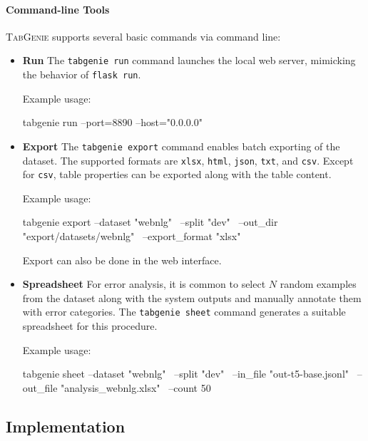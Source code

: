 \paragraph{Command-line Tools} \textsc{TabGenie} supports several basic commands via command line:
\begin{itemize}
    \item \textbf{Run} The \texttt{tabgenie run} command launches the local web server, mimicking the behavior of \texttt{flask run}.

          \noindent Example usage:
\begin{bash}
tabgenie run --port=8890 --host="0.0.0.0"
\end{bash}
    \item \textbf{Export} The \texttt{tabgenie export} command enables batch exporting of the dataset. The supported formats are \texttt{xlsx}, \texttt{html}, \texttt{json}, \texttt{txt}, and \texttt{csv}. Except for \texttt{csv}, table properties can be exported along with the table content.

          \noindent Example usage:
\begin{bash}
tabgenie export --dataset "webnlg" \
    --split "dev" \
    --out_dir "export/datasets/webnlg" \
    --export_format "xlsx"
\end{bash}
          \noindent Export can also be done in the web interface.
    \item \textbf{Spreadsheet} For error analysis, it is common to select $N$ random examples from the dataset along with the system outputs and manually annotate them with error categories. The \texttt{tabgenie sheet} command generates a suitable spreadsheet for this procedure.

          \noindent Example usage:
\begin{bash}
tabgenie sheet --dataset "webnlg" \
    --split "dev" \
    --in_file "out-t5-base.jsonl" \
    --out_file "analysis_webnlg.xlsx" \
    --count 50
    \end{bash}
\end{itemize}


\subsection{Implementation}
\label{sec:tabgenie:architecture}

